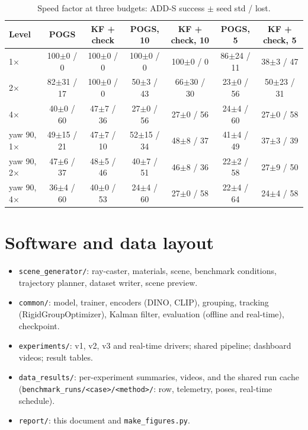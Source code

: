 \documentclass[10pt,a4paper]{article}
\begin{document}
\begin{table}[h]
\centering\small
\caption{Speed factor at three budgets: ADD-S success $\pm$ seed std / lost.}
\begin{tabular}{lcccccc}
\toprule
Level & POGS & KF + check & POGS, 10 & KF + check, 10 & POGS, 5 & KF + check, 5 \\
\midrule
1$\times$         & 100$\pm$0 / 0 & 100$\pm$0 / 0 & 100$\pm$0 / 0 & 100$\pm$0 / 0 & 86$\pm$24 / 11 & 38$\pm$3 / 47 \\
2$\times$         & 82$\pm$31 / 17 & 100$\pm$0 / 0 & 50$\pm$3 / 43 & 66$\pm$30 / 30 & 23$\pm$0 / 56 & 50$\pm$23 / 31 \\
4$\times$         & 40$\pm$0 / 60 & 47$\pm$7 / 36 & 27$\pm$0 / 56 & 27$\pm$0 / 56 & 24$\pm$4 / 60 & 27$\pm$0 / 58 \\
yaw 90, 1$\times$ & 49$\pm$15 / 21 & 47$\pm$7 / 10 & 52$\pm$15 / 34 & 48$\pm$8 / 37 & 41$\pm$4 / 49 & 37$\pm$3 / 39 \\
yaw 90, 2$\times$ & 47$\pm$6 / 37 & 48$\pm$5 / 46 & 40$\pm$7 / 51 & 46$\pm$8 / 36 & 22$\pm$2 / 58 & 27$\pm$9 / 50 \\
yaw 90, 4$\times$ & 36$\pm$4 / 60 & 40$\pm$0 / 53 & 24$\pm$4 / 60 & 27$\pm$0 / 58 & 22$\pm$4 / 64 & 24$\pm$4 / 58 \\
\bottomrule
\end{tabular}
\end{table}

\section{Software and data layout}
\begin{itemize}
  \item \texttt{scene\_generator/}: ray-caster, materials, scene, benchmark
        conditions, trajectory planner, dataset writer, scene preview.
  \item \texttt{common/}: model, trainer, encoders (DINO, CLIP), grouping,
        tracking (RigidGroupOptimizer), Kalman filter, evaluation (offline and
        real-time), checkpoint.
  \item \texttt{experiments/}: v1, v2, v3 and real-time drivers; shared pipeline;
        dashboard videos; result tables.
  \item \texttt{data\_results/}: per-experiment summaries, videos, and the shared
        run cache (\texttt{benchmark\_runs/\allowbreak<case>/\allowbreak<method>/}: row, telemetry, poses,
        real-time schedule).
  \item \texttt{report/}: this document and \texttt{make\_figures.py}.
\end{itemize}
\end{document}
